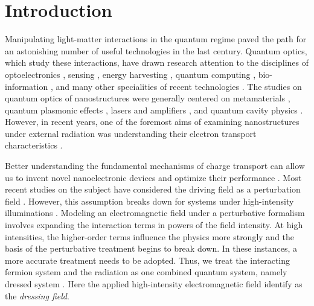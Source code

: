 \documentclass[
 reprint,
 amsmath,amssymb,
 aps,
 prb,
]{revtex4-2}
\begin{document}
\maketitle

\section{\label{sec:introduction} Introduction}

Manipulating light-matter interactions in the quantum regime paved the path for an astonishing number of useful technologies in the last century. Quantum optics, which study these interactions, have drawn research attention to the disciplines of optoelectronics \cite{liu16,wijesekara20,tao21,wijesekara21}, sensing \cite{rodrigo15,pirandola18,hapuarachchi2018}, energy harvesting \cite{weeraddana15,yuan16,sun18},
quantum computing \cite{huh15,slussarenko19,andersen21}, bio-information \cite{marais18,bian20}, and many other specialities of recent technologies \cite{rivera20}.
The studies on quantum optics of nanostructures were generally centered on metamaterials \cite{shalaev07,si14}, quantum plasmonic effects \cite{hapuarachchi19,perera20}, lasers and amplifiers \cite{chow13,jayasekara16,premaratne17}, and quantum cavity physics \cite{tsang10,liu17,devi20}.
However, in recent years, one of the foremost aims of examining nanostructures under external radiation was understanding their electron transport characteristics \cite{kitagawa11,zhou11,kibis14,pervishko15,morina15,dehghani15,dini16,wackerl20}.

Better understanding the fundamental mechanisms of charge transport can allow us to invent novel nanoelectronic devices and optimize their performance \cite{premaratne21}.
Most recent studies on the subject have considered the driving field as a perturbation field \cite{pervishko15,morina15}. However, this assumption breaks down for systems under high-intensity illuminations \cite{grifoni98,wackerl20}.
Modeling an electromagnetic field under a perturbative formalism involves expanding the interaction terms in powers of the field intensity. At high intensities, the higher-order terms influence the physics more strongly and the basis of the perturbative treatment begins to break down.
In these instances, a more accurate treatment needs to be adopted. Thus, we treat the interacting fermion system and the radiation as one combined quantum system, namely dressed system \cite{morina15,cohen98,scully01}. Here the applied high-intensity  electromagnetic field identify as the \textit{dressing field}.
\end{document}
